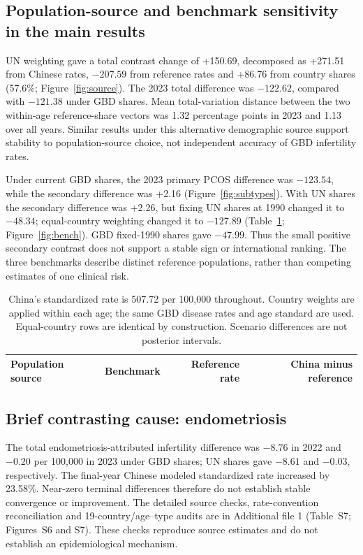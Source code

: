 \documentclass[11pt,a4paper]{article}
\begin{document}
\subsection{Population-source and benchmark sensitivity in the main results}
UN weighting gave a total contrast change of +150.69, decomposed as +271.51 from Chinese rates, $-207.59$ from reference rates and +86.76 from country shares (57.6\%; Figure~\ref{fig:source}). The 2023 total difference was $-122.62$, compared with $-121.38$ under GBD shares. Mean total-variation distance between the two within-age reference-share vectors was 1.32 percentage points in 2023 and 1.13 over all years. Similar results under this alternative demographic source support stability to population-source choice, not independent accuracy of GBD infertility rates.

Under current GBD shares, the 2023 primary PCOS difference was $-123.54$, while the secondary difference was +2.16 (Figure~\ref{fig:subtypes}). With UN shares the secondary difference was +2.26, but fixing UN shares at 1990 changed it to $-48.34$; equal-country weighting changed it to $-127.89$ (Table~\ref{tab:bench}; Figure~\ref{fig:bench}). GBD fixed-1990 shares gave $-47.99$. Thus the small positive secondary contrast does not support a stable sign or international ranking. The three benchmarks describe distinct reference populations, rather than competing estimates of one clinical risk.

\begin{table}[htbp]\centering\small{}
\caption{Benchmark definition changes the 2023 PCOS secondary infertility contrast.}\label{tab:bench}
\begin{tabular}{llrr}\toprule
Population source & Benchmark & Reference rate & China minus reference\\\midrule
\end{tabular}
\caption*{China's standardized rate is 507.72 per 100,000 throughout. Country weights are applied within each age; the same GBD disease rates and age standard are used. Equal-country rows are identical by construction. Scenario differences are not posterior intervals.}
\end{table}

\subsection{Brief contrasting cause: endometriosis}
The total endometriosis-attributed infertility difference was $-8.76$ in 2022 and $-0.20$ per 100,000 in 2023 under GBD shares; UN shares gave $-8.61$ and $-0.03$, respectively. The final-year Chinese modeled standardized rate increased by 23.58\%. Near-zero terminal differences therefore do not establish stable convergence or improvement. The detailed source checks, rate-convention reconciliation and 19-country/age--type audits are in Additional file 1 (Table~S7; Figures~S6 and S7). These checks reproduce source estimates and do not establish an epidemiological mechanism.
\end{document}
